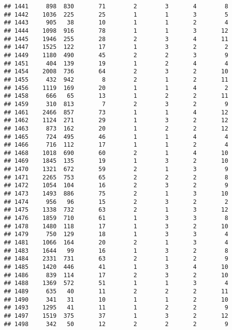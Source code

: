 \documentclass[]{article}
\begin{document}
\begin{verbatim}
## 1441     898  830       71        2        3       4        8
## 1442    1036  225       25        1        1       3        5
## 1443     905   38       10        1        1       2        4
## 1444    1098  916       78        1        1       3       12
## 1445    1946  255       28        2        3       4       11
## 1447    1525  122       17        1        3       2        2
## 1449    1180  490       45        2        2       3        9
## 1451     404  139       19        1        2       4        4
## 1454    2008  736       64        2        3       2       10
## 1455     432  942        8        2        1       2       11
## 1456    1119  169       20        1        1       4        2
## 1458     666   65       13        1        2       2       11
## 1459     310  813        7        2        3       2        9
## 1461    2466  857       73        1        1       4       12
## 1462    1124  271       29        1        3       2       12
## 1463     873  162       20        1        2       2       12
## 1465     724  495       46        1        1       4        4
## 1466     716  112       17        1        1       2        4
## 1468    1018  690       60        2        1       4       10
## 1469    1845  135       19        1        3       2       10
## 1470    1321  672       59        2        1       3        9
## 1471    2265  753       65        2        2       2        8
## 1472    1054  104       16        2        3       2        9
## 1473    1493  886       75        2        1       3       10
## 1474     956   96       15        2        3       2        2
## 1475    1338  732       63        2        1       3       12
## 1476    1859  710       61        1        3       3        8
## 1478    1480  118       17        1        3       2       10
## 1479     750  129       18        1        3       3        4
## 1481    1066  164       20        2        1       3        4
## 1483    1644   99       16        1        3       2        8
## 1484    2331  731       63        2        1       2        9
## 1485    1420  446       41        1        3       4       10
## 1486     839  114       17        2        3       2       10
## 1488    1369  572       51        1        1       3        4
## 1489     635   40       11        2        2       2       11
## 1490     341   31       10        1        1       2       10
## 1493    1295   41       11        1        2       2        9
## 1497    1519  375       37        1        3       2       12
## 1498     342   50       12        2        2       2        9

\end{verbatim}
\end{document}
